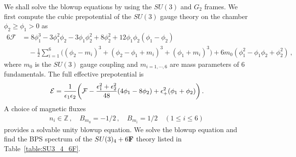 We shall solve the blowup equations by using the $ SU(3) $ and $ G_2 $ frames. We first compute the cubic prepotential of the $SU(3)$ gauge theory on the chamber $\phi_2\ge \phi_1>0$ as
\begin{align}
6\mathcal{F}
&= 8\phi_1^3 - 3\phi_1^2 \phi_2 - 3\phi_1 \phi_2^2 + 8\phi_2^2 + 12\phi_1 \phi_2(\phi_1 - \phi_2) \\
& \quad - \frac{1}{2} \sum_{i=1}^6 \Big((\phi_2 - m_i)^3 + (\phi_2 - \phi_1 + m_i)^3 + (\phi_1 + m_i)^3\Big) + 6m_0(\phi_1^2 - \phi_1 \phi_2 + \phi_2^2) \, ,  \nonumber
\end{align}
where $ m_0 $ is the $ SU(3) $ gauge coupling and $ m_{i=1, \cdots, 6} $ are mass parameters of 6 fundamentals. The full effective prepotential is
\begin{align}
\mathcal{E}
= \frac{1}{\epsilon_1 \epsilon_2} \qty(\mathcal{F} - \frac{\epsilon_1^2 + \epsilon_2^2}{48}(4\phi_1 - 8\phi_2 ) + \epsilon_+^2 (\phi_1 + \phi_2) ) \, .
\end{align}
A choice of magnetic fluxes
\begin{align}
n_i \in \mathbb{Z} \, , \quad
B_{m_0} = -1/2 \, , \quad
B_{m_i} = 1/2 \quad (1 \leq i \leq 6) \, 
\end{align}
provides a solvable unity blowup equation. We solve the blowup equation and find the BPS spectrum of the $SU(3)_4+6{\bf F}$ theory listed in Table~\ref{table:SU3_4_6F}.
